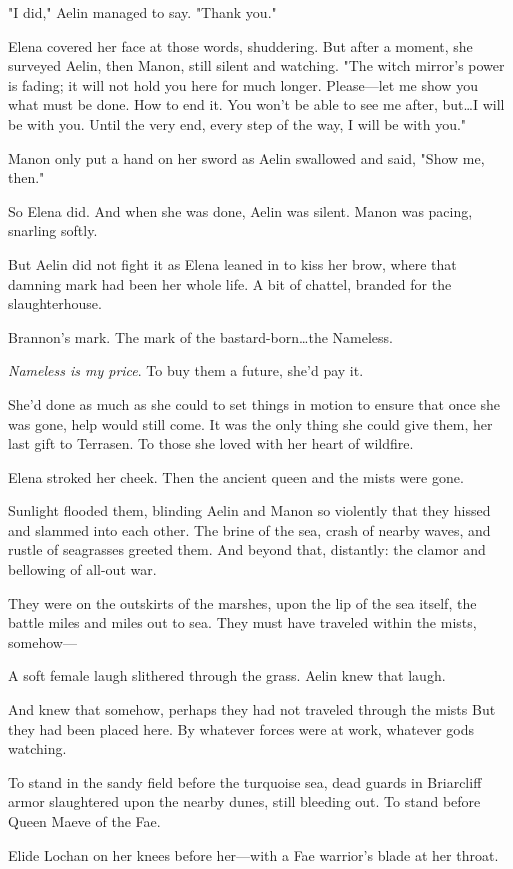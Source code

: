 "I did," Aelin managed to say.
"Thank you."

Elena covered her face at those words, shuddering.
But after a moment, she surveyed Aelin, then Manon, still silent and watching.
"The witch mirror's power is fading; it will not hold you here for much longer.
Please---let me show you what must be done.
How to end it.
You won't be able to see me after, but\ldots I will be with you.
Until the very end, every step of the way, I will be with you."

Manon only put a hand on her sword as Aelin swallowed and said, "Show me, then."

So Elena did.
And when she was done, Aelin was silent.
Manon was pacing, snarling softly.

But Aelin did not fight it as Elena leaned in to kiss her brow, where that damning mark had been her whole life.
A bit of chattel, branded for the slaughterhouse.

Brannon's mark.
The mark of the bastard-born\ldots the Nameless.

\emph{Nameless is my price}.
To buy them a future, she'd pay it.

She'd done as much as she could to set things in motion to ensure that once she was gone, help would still come.
It was the only thing she could give them, her last gift to Terrasen.
To those she loved with her heart of wildfire.

Elena stroked her cheek.
Then the ancient queen and the mists were gone.

Sunlight flooded them, blinding Aelin and Manon so violently that they hissed and slammed into each other.
The brine of the sea, crash of nearby waves, and rustle of seagrasses greeted them.
And beyond that, distantly: the clamor and bellowing of all-out war.

They were on the outskirts of the marshes, upon the lip of the sea itself, the battle miles and miles out to sea.
They must have traveled within the mists, somehow---

A soft female laugh slithered through the grass.
Aelin knew that laugh.

And knew that somehow, perhaps they had not traveled through the mists 
But they had been placed here.
By whatever forces were at work, whatever gods watching.

To stand in the sandy field before the turquoise sea, dead guards in Briarcliff armor slaughtered upon the nearby dunes, still bleeding out.
To stand before Queen Maeve of the Fae.

Elide Lochan on her knees before her---with a Fae warrior's blade at her throat.
